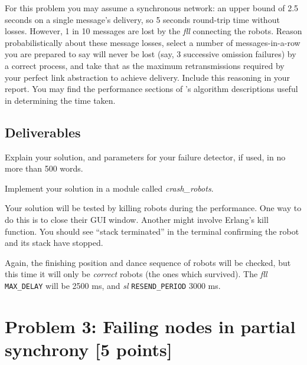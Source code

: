 \documentclass[a4paper]{article}
\begin{document}
For this problem you may assume a synchronous network: an upper bound of 2.5
seconds on a single message's delivery, so 5 seconds round-trip time without
losses. However, 1 in 10 messages are lost by the \emph{fll} connecting the
robots. Reason probabilistically about these message losses, select a number
of messages-in-a-row you are prepared to say will never be lost (say, 3
successive omission failures) by a correct process, and take that as the
maximum retransmissions required by your perfect link abstraction to achieve
delivery. Include this reasoning in your report. You may find the performance
sections of \cite{cachin2011}'s algorithm descriptions useful in determining
the time taken.




\subsection*{Deliverables} %
\label{sub:p2_deliverable}

Explain your solution, and parameters for your failure detector, if used, in
no more than 500 words.

Implement your solution in a module called \emph{crash\_robots}.

Your solution will be tested by killing robots during the performance. One way
to do this is to close their GUI window. Another might involve Erlang's kill
function. You should see ``stack terminated'' in the terminal confirming the
robot and its stack have stopped.

Again, the finishing position and dance sequence of robots will be checked,
but this time it will only be \emph{correct} robots (the ones which survived).
The \emph{fll} \verb!MAX_DELAY! will be 2500 ms, and \emph{sl}
\verb!RESEND_PERIOD! 3000 ms.















\section*{Problem 3: Failing nodes in partial synchrony [5 points]} %
\label{sec:problem_3_partial_synchrony}
\end{document}
